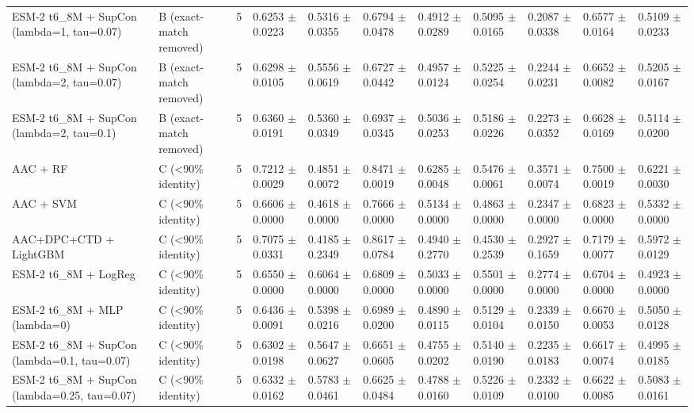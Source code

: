 \begin{table}[ht]
\begin{tabular}{lllllllllll}
ESM-2 t6\_8M + SupCon (lambda=1, tau=0.07) & B (exact-match removed) & 5 & 0.6253 $\pm$ 0.0223 & 0.5316 $\pm$ 0.0355 & 0.6794 $\pm$ 0.0478 & 0.4912 $\pm$ 0.0289 & 0.5095 $\pm$ 0.0165 & 0.2087 $\pm$ 0.0338 & 0.6577 $\pm$ 0.0164 & 0.5109 $\pm$ 0.0233 \\
ESM-2 t6\_8M + SupCon (lambda=2, tau=0.07) & B (exact-match removed) & 5 & 0.6298 $\pm$ 0.0105 & 0.5556 $\pm$ 0.0619 & 0.6727 $\pm$ 0.0442 & 0.4957 $\pm$ 0.0124 & 0.5225 $\pm$ 0.0254 & 0.2244 $\pm$ 0.0231 & 0.6652 $\pm$ 0.0082 & 0.5205 $\pm$ 0.0167 \\
ESM-2 t6\_8M + SupCon (lambda=2, tau=0.1) & B (exact-match removed) & 5 & 0.6360 $\pm$ 0.0191 & 0.5360 $\pm$ 0.0349 & 0.6937 $\pm$ 0.0345 & 0.5036 $\pm$ 0.0253 & 0.5186 $\pm$ 0.0226 & 0.2273 $\pm$ 0.0352 & 0.6628 $\pm$ 0.0169 & 0.5114 $\pm$ 0.0200 \\
AAC + RF & C (<90\% identity) & 5 & 0.7212 $\pm$ 0.0029 & 0.4851 $\pm$ 0.0072 & 0.8471 $\pm$ 0.0019 & 0.6285 $\pm$ 0.0048 & 0.5476 $\pm$ 0.0061 & 0.3571 $\pm$ 0.0074 & 0.7500 $\pm$ 0.0019 & 0.6221 $\pm$ 0.0030 \\
AAC + SVM & C (<90\% identity) & 5 & 0.6606 $\pm$ 0.0000 & 0.4618 $\pm$ 0.0000 & 0.7666 $\pm$ 0.0000 & 0.5134 $\pm$ 0.0000 & 0.4863 $\pm$ 0.0000 & 0.2347 $\pm$ 0.0000 & 0.6823 $\pm$ 0.0000 & 0.5332 $\pm$ 0.0000 \\
AAC+DPC+CTD + LightGBM & C (<90\% identity) & 5 & 0.7075 $\pm$ 0.0331 & 0.4185 $\pm$ 0.2349 & 0.8617 $\pm$ 0.0784 & 0.4940 $\pm$ 0.2770 & 0.4530 $\pm$ 0.2539 & 0.2927 $\pm$ 0.1659 & 0.7179 $\pm$ 0.0077 & 0.5972 $\pm$ 0.0129 \\
ESM-2 t6\_8M + LogReg & C (<90\% identity) & 5 & 0.6550 $\pm$ 0.0000 & 0.6064 $\pm$ 0.0000 & 0.6809 $\pm$ 0.0000 & 0.5033 $\pm$ 0.0000 & 0.5501 $\pm$ 0.0000 & 0.2774 $\pm$ 0.0000 & 0.6704 $\pm$ 0.0000 & 0.4923 $\pm$ 0.0000 \\
ESM-2 t6\_8M + MLP (lambda=0) & C (<90\% identity) & 5 & 0.6436 $\pm$ 0.0091 & 0.5398 $\pm$ 0.0216 & 0.6989 $\pm$ 0.0200 & 0.4890 $\pm$ 0.0115 & 0.5129 $\pm$ 0.0104 & 0.2339 $\pm$ 0.0150 & 0.6670 $\pm$ 0.0053 & 0.5050 $\pm$ 0.0128 \\
ESM-2 t6\_8M + SupCon (lambda=0.1, tau=0.07) & C (<90\% identity) & 5 & 0.6302 $\pm$ 0.0198 & 0.5647 $\pm$ 0.0627 & 0.6651 $\pm$ 0.0605 & 0.4755 $\pm$ 0.0202 & 0.5140 $\pm$ 0.0190 & 0.2235 $\pm$ 0.0183 & 0.6617 $\pm$ 0.0074 & 0.4995 $\pm$ 0.0185 \\
ESM-2 t6\_8M + SupCon (lambda=0.25, tau=0.07) & C (<90\% identity) & 5 & 0.6332 $\pm$ 0.0162 & 0.5783 $\pm$ 0.0461 & 0.6625 $\pm$ 0.0484 & 0.4788 $\pm$ 0.0160 & 0.5226 $\pm$ 0.0109 & 0.2332 $\pm$ 0.0100 & 0.6622 $\pm$ 0.0085 & 0.5083 $\pm$ 0.0161 \\

\end{tabular}
\end{table}
